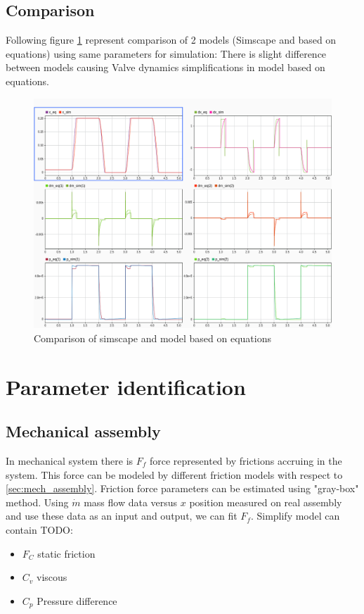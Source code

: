 \documentclass[class=article, crop=false]{standalone}
\begin{document}
\subsection{Comparison}
Following figure \ref{fig:compare_of_models} represent comparison of 2 models
(Simscape and based on equations) using same parameters for simulation:
There is slight difference between models causing Valve dynamics
simplifications in model based on equations.

\begin{figure}[h!]
    \centering
    \includegraphics[width=1\textwidth]{models_comparation.png}
    \caption{Comparison of simscape and model based on equations}
    \label{fig:compare_of_models}
\end{figure}


\pagebreak
\section{Parameter identification}
\subsection{Mechanical assembly}
In mechanical system there is $F_f$ force represented by frictions accruing
in the system. This force can be modeled by different friction models with
respect to \ref{sec:mech_assembly}. Friction force parameters can be
estimated using "gray-box" method. 
Using $\dot{m}$ mass flow data versus $x$ position measured on real assembly
and use these data as an input and output, we can fit $F_f$.
Simplify model can contain TODO:
\begin{itemize}
    \item $F_C$ static friction
    \item $C_v$ viscous
    \item $C_p$ Pressure difference
\end{itemize}
\end{document}
